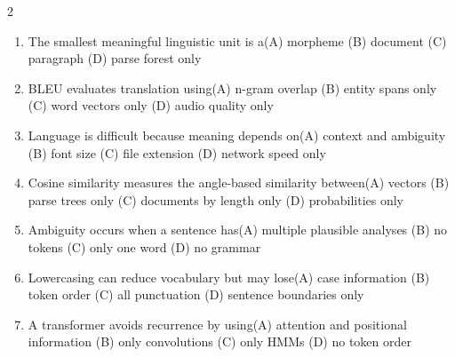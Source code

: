 \documentclass[a4paper]{article}
\begin{document}
\begin{multicols*}{2}
\begin{enumerate}
\item The smallest meaningful linguistic unit is a\newline\hspace*{0.6em}(A) morpheme \quad (B) document \newline\hspace*{0.6em}(C) paragraph \quad (D) parse forest only
\item BLEU evaluates translation using\newline\hspace*{0.6em}(A) n-gram overlap \quad (B) entity spans only \newline\hspace*{0.6em}(C) word vectors only \quad (D) audio quality only
\item Language is difficult because meaning depends on\newline\hspace*{0.6em}(A) context and ambiguity \quad (B) font size \newline\hspace*{0.6em}(C) file extension \quad (D) network speed only
\item Cosine similarity measures the angle-based similarity between\newline\hspace*{0.6em}(A) vectors \quad (B) parse trees only \newline\hspace*{0.6em}(C) documents by length only \quad (D) probabilities only
\item Ambiguity occurs when a sentence has\newline\hspace*{0.6em}(A) multiple plausible analyses \quad (B) no tokens \newline\hspace*{0.6em}(C) only one word \quad (D) no grammar
\item Lowercasing can reduce vocabulary but may lose\newline\hspace*{0.6em}(A) case information \quad (B) token order \newline\hspace*{0.6em}(C) all punctuation \quad (D) sentence boundaries only
\item A transformer avoids recurrence by using\newline\hspace*{0.6em}(A) attention and positional information \quad (B) only convolutions \newline\hspace*{0.6em}(C) only HMMs \quad (D) no token order

\end{enumerate}
\end{multicols*}
\end{document}
